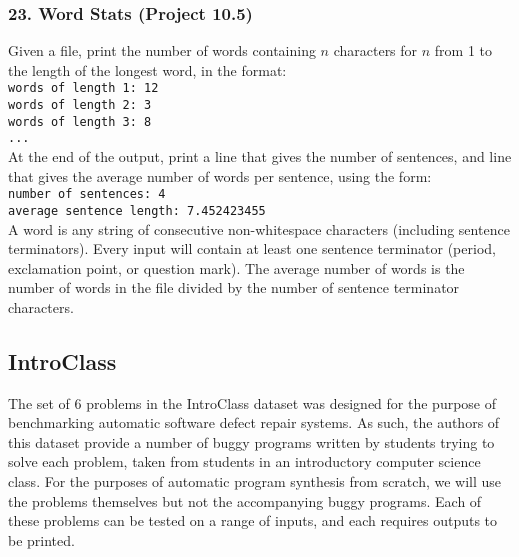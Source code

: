 \documentclass{sig-alternate}
\begin{document}
\subsubsection*{23. Word Stats (Project 10.5)}
Given a file, print the number of words containing $n$ characters for $n$ from 1 to the length of the longest word, in the format:
\texttt{ \\
words of length 1: 12 \\
words of length 2: 3 \\
words of length 3: 8 \\
... \\
} %
At the end of the output, print a line that gives the number of sentences, and line that gives the average number of words per sentence, using the form:
\texttt{ \\
number of sentences: 4 \\
average sentence length: 7.452423455 \\
} %
A word is any string of consecutive non-whitespace characters (including sentence terminators). Every input will contain at least one sentence terminator (period, exclamation point, or question mark). The average number of words is the number of words in the file divided by the number of sentence terminator characters.

\subsection{IntroClass}


The set of 6 problems in the IntroClass dataset \cite{ManyBugsAndIntroClass, Brun13TRgptest} was designed for the purpose of benchmarking automatic software defect repair systems. As such, the authors of this dataset provide a number of buggy programs written by students trying to solve each problem, taken from students in an introductory computer science class. For the purposes of automatic program synthesis from scratch, we will use the problems themselves but not the accompanying buggy programs. 
Each of these problems can be tested on a range of inputs, and each requires outputs to be printed.
\end{document}
